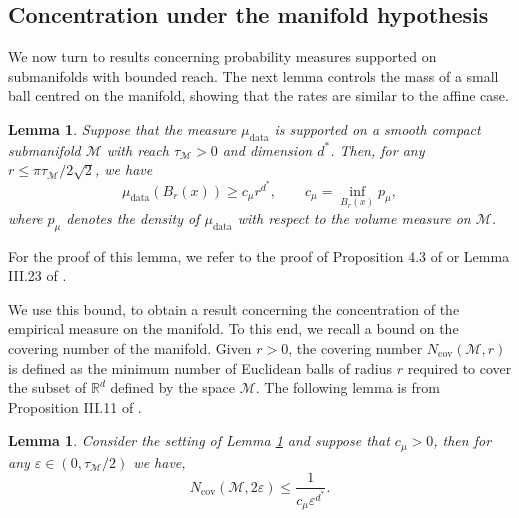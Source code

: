 \documentclass[10pt]{article}
\theoremstyle{plain}
\newtheorem{lemma}[theorem]{Lemma}
\theoremstyle{definition}
\theoremstyle{remark}
\newcommand{\M}{{\mathcal{M}}}
\newcommand{\R}{\mathbb{R}}
\newcommand{\mud}{\mu_{\operatorname{data}}}
\begin{document}
\subsection{Concentration under the manifold hypothesis}

We now turn to results concerning probability measures supported on submanifolds with bounded reach. The next lemma controls the mass of a small ball centred on the manifold, showing that the rates are similar to the affine case.

\begin{lemma}\label{lem:reach_ball_mass}
Suppose that the measure \(\mud\) is supported on a smooth compact submanifold \(\M\) with reach \(\tau_\M > 0\) and dimension \(d^*\). Then, for any \(r \leq \pi \tau_\M/2\sqrt{2}\), we have
\begin{equation*}
    \mud(B_r(x)) \geq c_\mu r^{d^*}, \qquad c_\mu = \inf_{B_r(x)} p_\mu,
\end{equation*}
where \(p_\mu\) denotes the density of \(\mud\) with respect to the volume measure on \(\M\).
\end{lemma}
For the proof of this lemma, we refer to the proof of Proposition 4.3 of \citep{Aamari2019-gk} or Lemma III.23 of \citep{Aamari2017-he}.

We use this bound, to obtain a result concerning the concentration of the empirical measure on the manifold. To this end, we recall a bound on the covering number of the manifold. Given \(r > 0\), the covering number \(N_{\text{cov}}(\M, r)\) is defined as the minimum number of Euclidean balls of radius \(r\) required to cover the subset of \(\R^d\) defined by the space \(\M\). The following lemma is from Proposition III.11 of \cite{Aamari2017-he}.
\begin{lemma}\label{lem:mani_cover}
Consider the setting of Lemma \ref{lem:reach_ball_mass} and suppose that \(c_\mu > 0\), then for any \(\varepsilon \in (0, \tau_\M/2)\) we have,
\begin{equation*}
    N_{\text{cov}}(\M, 2\varepsilon) \leq \frac{1}{c_\mu \varepsilon^{d^*}}.
\end{equation*}
\end{lemma}
\end{document}
